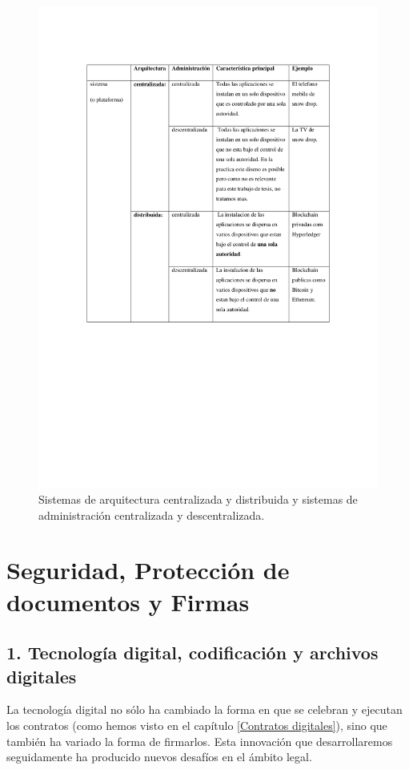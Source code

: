 \documentclass[12pt]{report} %
\begin{document}
\begin{figure}
\centering
\includegraphics[width=0.85\columnwidth]{imagenes/imagendesc7).pdf}
\caption{Sistemas de arquitectura centralizada y distribuida y sistemas  de administración centralizada y descentralizada.}
\label{imagendesc7).pdf}
\end{figure} 

\chapter{Seguridad, Protección de documentos y Firmas}
\label{Seguridad, Protección de documentos y Firmas}

\section{1.	Tecnología digital, codificación y archivos digitales}

La tecnología digital no sólo ha cambiado la forma en que se celebran y ejecutan los contratos (como hemos visto en el capítulo \ref{Contratos digitales}), sino que también ha variado la forma de firmarlos. Esta innovación que desarrollaremos seguidamente ha producido nuevos desafíos en el ámbito legal. 
\end{document}
